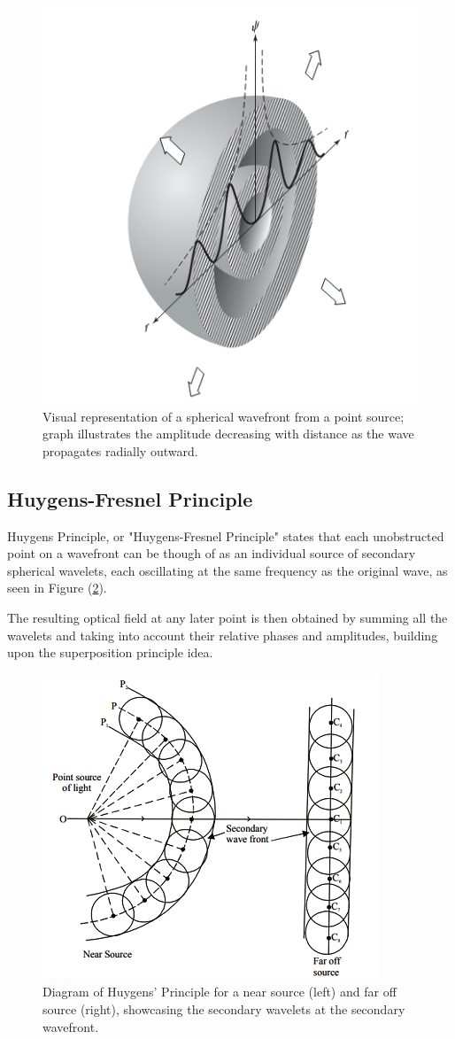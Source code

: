 \documentclass[12pt]{article}
\begin{document}
\begin{figure}[H]
    \centering
    \includegraphics[width=.5\textwidth]{SphericalWavefront.png}
    \caption{Visual representation of a spherical wavefront from a point source; graph illustrates the amplitude decreasing with distance as the wave propagates radially outward. \cite{hecht2012optics}}
    \label{fig:1}
\end{figure}

\subsection{Huygens-Fresnel Principle} \label{sec:2.2}

Huygens Principle, or "Huygens-Fresnel Principle" states that each unobstructed point on a wavefront can be though of as an individual source of secondary spherical wavelets, each oscillating at the same frequency as the original wave,
as seen in Figure (\ref{fig:2}). \cite{hecht2012optics,enwiki:1291861847,likharev2013essential,Born_Wolf_Bhatia_Clemmow_Gabor_Stokes_Taylor_Wayman_Wilcock_1999}

The resulting optical field at any later point is then obtained by summing all the wavelets and taking into account their relative phases and amplitudes, building upon the superposition principle idea. \cite{hecht2012optics,Born_Wolf_Bhatia_Clemmow_Gabor_Stokes_Taylor_Wayman_Wilcock_1999}

\begin{figure}[H]
    \centering
    \includegraphics[width=.5\textwidth]{huygens.png}
    \caption{Diagram of Huygens' Principle for a near source (left) and far off source (right), showcasing the secondary wavelets at the secondary wavefront. \cite{huygensimgsource}}
    \label{fig:2}
\end{figure}
\end{document}
